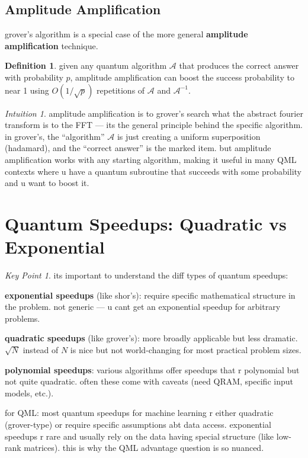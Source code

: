\documentclass[11pt,a4paper]{article}
\theoremstyle{definition}
\newtheorem{definition}{Definition}[section]
\theoremstyle{remark}
\newtheorem*{intuition}{Intuition}
\newtheorem*{keypoint}{Key Point}
\begin{document}
\subsection{Amplitude Amplification}

grover's algorithm is a special case of the more general \textbf{amplitude amplification} technique.

\begin{definition}
given any quantum algorithm $\mathcal{A}$ that produces the correct answer with probability $p$, amplitude amplification can boost the success probability to near 1 using $O(1/\sqrt{p})$ repetitions of $\mathcal{A}$ and $\mathcal{A}^{-1}$.
\end{definition}

\begin{intuition}
amplitude amplification is to grover's search what the abstract fourier transform is to the FFT --- its the general principle behind the specific algorithm. in grover's, the ``algorithm'' $\mathcal{A}$ is just creating a uniform superposition (hadamard), and the ``correct answer'' is the marked item. but amplitude amplification works with any starting algorithm, making it useful in many QML contexts where u have a quantum subroutine that succeeds with some probability and u want to boost it.
\end{intuition}

\section{Quantum Speedups: Quadratic vs Exponential}

\begin{keypoint}
its important to understand the diff types of quantum speedups:

\textbf{exponential speedups} (like shor's): require specific mathematical structure in the problem. not generic --- u cant get an exponential speedup for arbitrary problems.

\textbf{quadratic speedups} (like grover's): more broadly applicable but less dramatic. $\sqrt{N}$ instead of $N$ is nice but not world-changing for most practical problem sizes.

\textbf{polynomial speedups}: various algorithms offer speedups that r polynomial but not quite quadratic. often these come with caveats (need QRAM, specific input models, etc.).

for QML: most quantum speedups for machine learning r either quadratic (grover-type) or require specific assumptions abt data access. exponential speedups r rare and usually rely on the data having special structure (like low-rank matrices). this is why the QML advantage question is so nuanced.
\end{keypoint}
\end{document}
